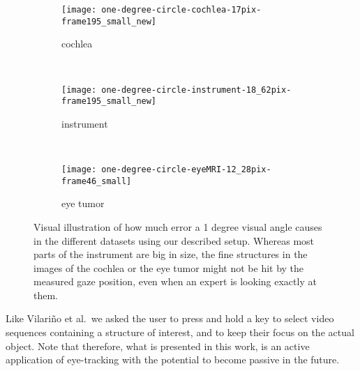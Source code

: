 \begin{figure}[ht]
	\centering
	\begin{subfigure}[h]{0.31\textwidth}
		\texttt{[image: one-degree-circle-cochlea-17pix-frame195\_small\_new]}	
		\caption*{cochlea}
	\end{subfigure}
	~
	\begin{subfigure}[h]{0.31\textwidth}
		\texttt{[image: one-degree-circle-instrument-18\_62pix-frame195\_small\_new]}
		\caption*{instrument}
	\end{subfigure}
	~
	\begin{subfigure}[h]{0.31\textwidth}
		\texttt{[image: one-degree-circle-eyeMRI-12\_28pix-frame46\_small]}	
		\caption*{eye tumor}
	\end{subfigure}
	\caption{Visual illustration of how much error a 1 degree visual angle causes in the different datasets using our described setup. Whereas most parts of the instrument are big in size, the fine structures in the images of the cochlea or the eye tumor might not be hit by the measured gaze position, even when an expert is looking exactly at them.}
	\label{fig:onedegreecircle}
\end{figure}

Like Vilari\~no et al.\, we asked the user to press and hold a key to select video sequences containing a structure of interest, and to keep their focus on the actual object. 
Note that therefore, what is presented in this work, is an active application of eye-tracking with the potential to become passive in the future.

